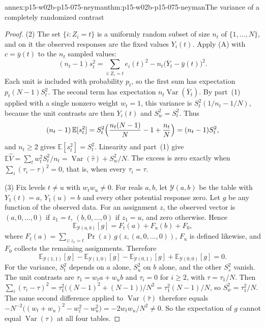 \begin{annexitem}{annex:p15-w02b-p15-075-neyman}{thm:p15-w02b-p15-075-neyman}{The variance of a completely randomized contrast}
\begin{proof}
(2) The set \(\{i:Z_i=t\}\) is a uniformly random subset of size \(n_t\)
of \(\{1,\ldots,N\}\), and on it the observed responses are the fixed values
\(Y_i(t)\). Apply (A) with \(c=\bar y(t)\) to the \(n_t\) sampled values:
\[
 (n_t-1)s_t^2=\sum_{i:Z_i=t}e_i(t)^2-n_t\bigl(\overline Y_t-\bar y(t)\bigr)^2.
\]
Each unit is included with probability \(p_t\), so the first sum has
expectation \(p_t(N-1)S_t^2\). The second term has expectation
\(n_t\operatorname{Var}(\overline Y_t)\). By part~(1) applied with a single
nonzero weight \(w_t=1\), this variance is \(S_t^2(1/n_t-1/N)\), because the
unit contrasts are then \(Y_i(t)\) and \(S_w^2=S_t^2\). Thus
\[
 (n_t-1)\,\mathbb E[s_t^2]
 =S_t^2\Bigl(\frac{n_t(N-1)}N-1+\frac{n_t}N\Bigr)=(n_t-1)S_t^2,
\]
and \(n_t\geq2\) gives \(\mathbb E[s_t^2]=S_t^2\). Linearity and part~(1)
give \(\mathbb E\widehat V=\sum_tw_t^2S_t^2/n_t
=\operatorname{Var}(\widehat\tau)+S_w^2/N\). The excess is zero exactly when
\(\sum_i(\tau_i-\tau)^2=0\), that is, when every \(\tau_i=\tau\).

(3) Fix levels \(t\neq u\) with \(w_tw_u\neq0\). For reals \(a,b\), let
\(\mathcal Y(a,b)\) be the table with \(Y_1(t)=a\), \(Y_1(u)=b\) and every
other potential response zero. Let \(g\) be any function of the observed data.
For an assignment \(z\), the observed vector is \((a,0,\ldots,0)\) if
\(z_1=t\), \((b,0,\ldots,0)\) if \(z_1=u\), and zero otherwise. Hence
\[
 \mathbb E_{\mathcal Y(a,b)}[g]=F_t(a)+F_u(b)+F_0,
\]
where \(F_t(a)=\sum_{z:z_1=t}\Pr(z)\,g(z,(a,0,\ldots,0))\), \(F_u\) is
defined likewise, and \(F_0\) collects the remaining assignments. Therefore
\[
 \mathbb E_{\mathcal Y(1,1)}[g]-\mathbb E_{\mathcal Y(1,0)}[g]
 -\mathbb E_{\mathcal Y(0,1)}[g]+\mathbb E_{\mathcal Y(0,0)}[g]=0 .
\]
For the variance, \(S_t^2\) depends on \(a\) alone, \(S_u^2\) on \(b\)
alone, and the other \(S_s^2\) vanish. The unit contrasts are
\(\tau_1=w_ta+w_ub\) and \(\tau_i=0\) for \(i\geq2\), with
\(\tau=\tau_1/N\). Then
\(\sum_i(\tau_i-\tau)^2=\tau_1^2\bigl((N-1)^2+(N-1)\bigr)/N^2=\tau_1^2(N-1)/N\),
so \(S_w^2=\tau_1^2/N\). The same second difference applied to
\(\operatorname{Var}(\widehat\tau)\) therefore equals
\(-N^{-2}\bigl((w_t+w_u)^2-w_t^2-w_u^2\bigr)=-2w_tw_u/N^2\neq0\). So the
expectation of \(g\) cannot equal \(\operatorname{Var}(\widehat\tau)\) at all
four tables.
\end{proof}
\end{annexitem}

